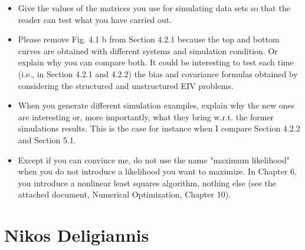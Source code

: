 \documentclass[11pt]{article}
\begin{document}
\begin{itemize}
    \item Give the values of the matrices you use for simulating data sets so that the reader can test what you have carried out. 
    
    \item Please remove Fig. 4.1 b from Section 4.2.1 because the top and bottom curves are obtained with different systems and simulation condition. Or explain why you can compare both. It could be interesting to test each time (i.e., in Section 4.2.1 and 4.2.2) the bias and covariance formulas obtained by considering the structured and unstructured EIV problems. 
    
    \item  When you generate different simulation examples, explain why the new ones are interesting or, more importantly, what they bring w.r.t. the former simulations results. This is the case for instance when I compare Section 4.2.2 and Section 5.1. 
    
    \item Except if you can convince me, do not use the name "maximum likelihood" when you do not introduce a likelihood you want to maximize. In Chapter 6, you introduce a nonlinear least squares algorithm, nothing else (see the attached document, Numerical Optimization, Chapter 10).
    

\end{itemize}

\section*{Nikos Deligiannis}
\end{document}
